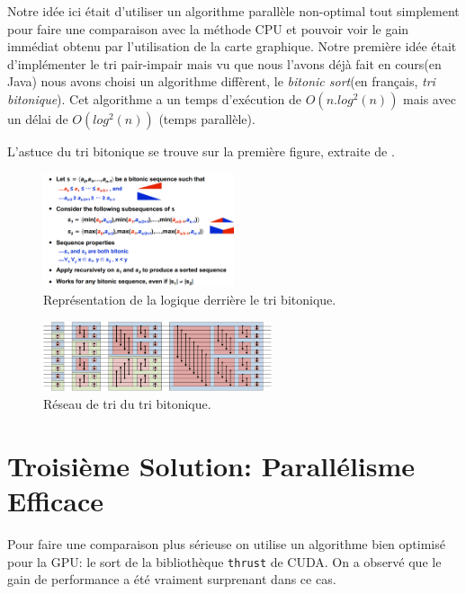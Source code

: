 \documentclass[12pt,oneside]{article}
\begin{document}
Notre idée ici était d'utiliser un algorithme parallèle non-optimal tout simplement pour faire une comparaison avec la méthode CPU et pouvoir voir le gain immédiat obtenu par l'utilisation de la carte graphique. Notre première idée était d’implémenter le tri pair-impair mais vu que nous l'avons déjà fait en cours(en Java) nous avons choisi un algorithme diffèrent, le \textit{bitonic sort}(en français, \textit{tri bitonique}). Cet algorithme a un temps d’exécution de $O(n.log^{2}(n))$ mais avec un délai de $O(log^{2}(n))$ (temps parallèle). \newline

 L'astuce du tri bitonique se trouve sur la première figure, extraite de \cite{Venu}.






\begin{figure}[h]
\centering
\includegraphics[width=0.5\textwidth]{bitonic_split.png}
\caption{\label{fig:BitonicSort}Représentation de la logique derrière le tri bitonique.}
\end{figure}

\begin{figure}[h]
\centering
\includegraphics[width=0.6\textwidth]{BitonicSort1.png}
\caption{\label{fig:BitonicSort}Réseau de tri du tri bitonique.}
\end{figure}

\newpage

\section{Troisième Solution: Parallélisme Efficace}

Pour faire une comparaison plus sérieuse on utilise un algorithme bien optimisé pour la GPU: le sort de la bibliothèque \texttt{thrust} de CUDA. On a observé que le gain de performance a été vraiment surprenant dans ce cas.
\end{document}
